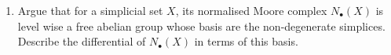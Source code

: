 \begin{Exercise}
	\begin{enumerate}[resume, label=(\alph*)]
		\item 
		Argue that for a simplicial set $ X $, its normalised Moore complex $ N_{ \bullet } ( X ) $ is level wise a free abelian group whose basis are the non-degenerate simplices.
		Describe the differential of $ N_{ \bullet } ( X ) $ in terms of this basis.
	\end{enumerate}
\end{Exercise}
